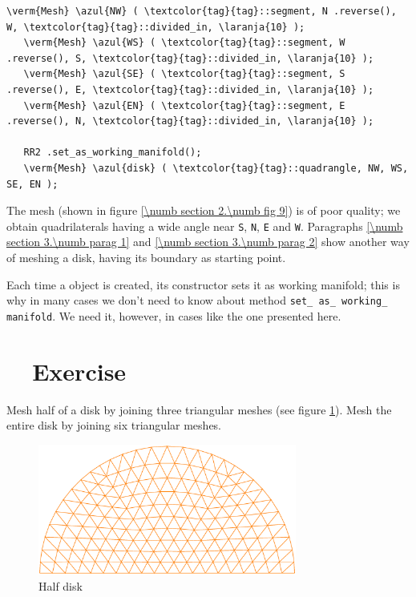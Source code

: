 \begin{Verbatim}[commandchars=\\\{\},formatcom=\small\tt,frame=single,
   label=parag-\ref{\numb section 2.\numb parag 9}.cpp,rulecolor=\color{coment},
   baselinestretch=0.94,framesep=2mm]
   \verm{Mesh} \azul{NW} ( \textcolor{tag}{tag}::segment, N .reverse(), W, \textcolor{tag}{tag}::divided_in, \laranja{10} );
   \verm{Mesh} \azul{WS} ( \textcolor{tag}{tag}::segment, W .reverse(), S, \textcolor{tag}{tag}::divided_in, \laranja{10} );
   \verm{Mesh} \azul{SE} ( \textcolor{tag}{tag}::segment, S .reverse(), E, \textcolor{tag}{tag}::divided_in, \laranja{10} );
   \verm{Mesh} \azul{EN} ( \textcolor{tag}{tag}::segment, E .reverse(), N, \textcolor{tag}{tag}::divided_in, \laranja{10} );
   
   RR2 .set_as_working_manifold();
   \verm{Mesh} \azul{disk} ( \textcolor{tag}{tag}::quadrangle, NW, WS, SE, EN );
\end{Verbatim}

The mesh (shown in figure \ref{\numb section 2.\numb fig 9}) is of poor quality;
we obtain quadrilaterals having a wide angle near {\small\tt S}, {\small\tt N}, {\small\tt E}
and {\small\tt W}.
Paragraphs \ref{\numb section 3.\numb parag 1} and \ref{\numb section 3.\numb parag 2} show
another way of meshing a disk, having its boundary as starting point.

Each time a {\small\tt{}} object is created, its constructor sets it as
working manifold; this is why in many cases we don't need to know about method
{\small\tt set\_\,as\_\,working\_\,manifold}.
We need it, however, in cases like the one presented here.


\section{~~Exercise}\label{\numb section 2.\numb parag 10}

Mesh half of a disk by joining three triangular meshes
(see figure \ref{\numb section 2.\numb fig 10}).
Mesh the entire disk by joining six triangular meshes.

\begin{figure}[ht] \centering
  \includegraphics[width=85mm]{half-disk}
  \caption{Half disk}
  \label{\numb section 2.\numb fig 10}
\end{figure}


